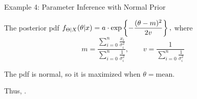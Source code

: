 \begin{frame}{Example 4: Parameter Inference with Normal Prior}

\hfill {}

\plitemsep 0.05in
\bci

\item<1-> The posterior pdf $\displaystyle f_{\Theta|X}(\theta|x) = a \cdot \exp \left\{ -
    \frac{(\theta - m)^2}{2 v}  \right\},$ where
  $$
  m = \frac
  {\sum_{i=0}^n \frac{x_i}{\sigma_i^2}}
  {\sum_{i=0}^n \frac{1}{\sigma_i^2}}, \qquad v =
  \frac{1}{\sum_{i=0}^n \frac{1}{\sigma_i^2}}
  $$


\item<2-> The pdf is normal, so it is maximized when $\theta =
  \text{mean}.$

\item<3-> Thus, .

  \eci

\end{frame}










